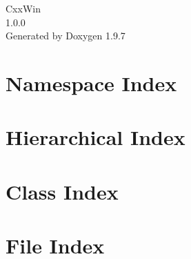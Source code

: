 \documentclass[twoside]{book}
\newcommand{\+}{\discretionary{\mbox{\scriptsize$\hookleftarrow$}}{}{}}
\newcommand{\clearemptydoublepage}{%
    \newpage{\pagestyle{empty}\cleardoublepage}%
  }
\begin{document}
  \raggedbottom
    \hypersetup{pageanchor=false,
                bookmarksnumbered=true,
                pdfencoding=unicode
               }
  \begin{titlepage}
  \vspace*{7cm}
  \begin{center}%
  {\Large Cxx\+Win}\\
  [1ex]\large 1.\+0.\+0 \\
  \vspace*{1cm}
  {\large Generated by Doxygen 1.9.7}\\
  \end{center}
  \end{titlepage}
  \clearemptydoublepage
  \tableofcontents
  \clearemptydoublepage
  \hypersetup{pageanchor=true}

\chapter{Namespace Index}

\chapter{Hierarchical Index}

\chapter{Class Index}

\chapter{File Index}

\end{document}

